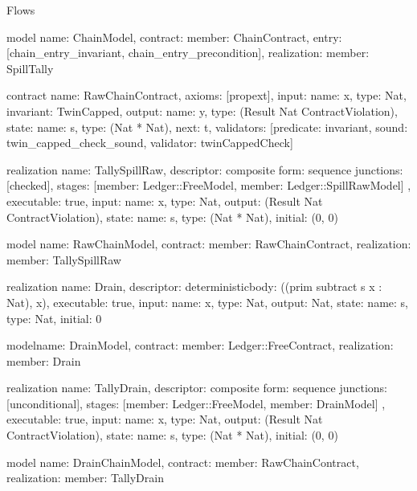 \begin{lexlean}{Flows}
\begin{semanticmodule}
model{
  name: ChainModel,
  contract: {member: ChainContract},
  entry: [chain_entry_invariant, chain_entry_precondition],
  realization: {member: SpillTally}
}

contract{
  name: RawChainContract,
  axioms: [propext],
  input: {name: x, type: Nat},
  invariant: TwinCapped,
  output: {name: y, type: (Result Nat ContractViolation)},
  state: {name: s, type: (Nat * Nat), next: t},
  validators: [{predicate: invariant, sound: twin_capped_check_sound, validator: twinCappedCheck}]
}

realization{
  name: TallySpillRaw,
  descriptor: composite{
    form: sequence{
      junctions: [checked{}],
      stages: [{member: Ledger::FreeModel}, {member: Ledger::SpillRawModel}]
    }
  },
  executable: true,
  input: {name: x, type: Nat},
  output: (Result Nat ContractViolation),
  state: {name: s, type: (Nat * Nat), initial: (0, 0)}
}

model{
  name: RawChainModel,
  contract: {member: RawChainContract},
  realization: {member: TallySpillRaw}
}

realization{
  name: Drain,
  descriptor: deterministic{body: ((prim subtract s x : Nat), x)},
  executable: true,
  input: {name: x, type: Nat},
  output: Nat,
  state: {name: s, type: Nat, initial: 0}
}

model{name: DrainModel, contract: {member: Ledger::FreeContract}, realization: {member: Drain}}

realization{
  name: TallyDrain,
  descriptor: composite{
    form: sequence{
      junctions: [unconditional{}],
      stages: [{member: Ledger::FreeModel}, {member: DrainModel}]
    }
  },
  executable: true,
  input: {name: x, type: Nat},
  output: (Result Nat ContractViolation),
  state: {name: s, type: (Nat * Nat), initial: (0, 0)}
}

model{
  name: DrainChainModel,
  contract: {member: RawChainContract},
  realization: {member: TallyDrain}
}
\end{semanticmodule}
\end{lexlean}
